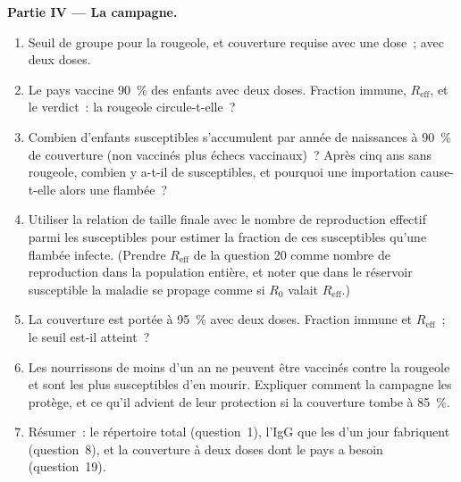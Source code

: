 \begin{problem}
\medskip
\noindent\textbf{Partie IV --- La campagne.}
\begin{enumerate}[resume]
  \item Seuil de groupe pour la rougeole, et couverture requise avec une
        dose~; avec deux doses.
  \item Le pays vaccine \qty{90}{\%} des enfants avec deux doses.
        Fraction immune, $R_{\text{eff}}$, et le verdict~: la rougeole
        circule-t-elle~?
  \item Combien d'enfants susceptibles s'accumulent par année de
        naissances à \qty{90}{\%} de couverture (non vaccinés plus
        échecs vaccinaux)~? Après cinq ans sans rougeole, combien y
        a-t-il de susceptibles, et pourquoi une importation cause-t-elle
        alors une flambée~?
  \item Utiliser la relation de taille finale avec le nombre de
        reproduction effectif parmi les susceptibles pour estimer la
        fraction de ces susceptibles qu'une flambée infecte. (Prendre
        $R_{\text{eff}}$ de la question 20 comme nombre de reproduction
        dans la population entière, et noter que dans le réservoir
        susceptible la maladie se propage comme si $R_{0}$ valait
        $R_{\text{eff}}$.)
  \item La couverture est portée à \qty{95}{\%} avec deux doses.
        Fraction immune et $R_{\text{eff}}$~; le seuil est-il atteint~?
  \item Les nourrissons de moins d'un an ne peuvent être vaccinés contre
        la rougeole et sont les plus susceptibles d'en mourir. Expliquer
        comment la campagne les protège, et ce qu'il advient de leur
        protection si la couverture tombe à \qty{85}{\%}.
  \item Résumer~: le répertoire total (question~1), l'IgG que les
         d'un jour fabriquent (question~8), et la couverture
        à deux doses dont le pays a besoin (question~19).
\end{enumerate}
\end{problem}
